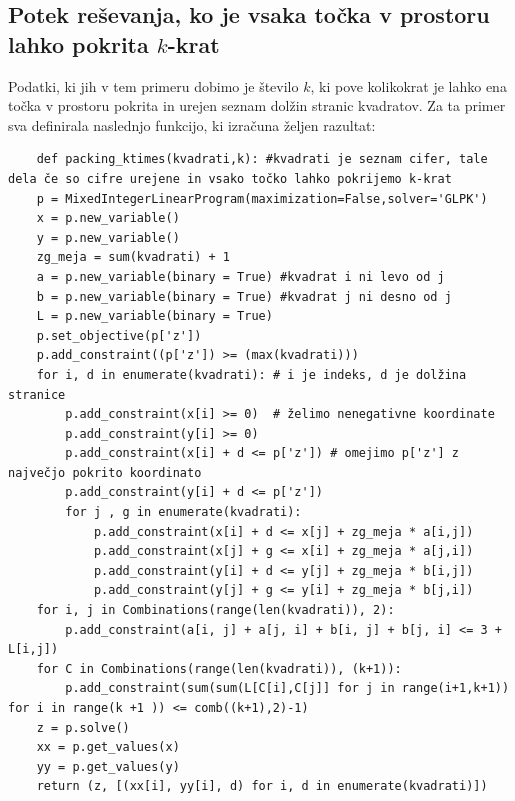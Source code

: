 \documentclass[a4paper, 11pt]{article}
\begin{document}
\subsection{Potek reševanja, ko je vsaka točka v prostoru lahko pokrita $k$-krat}
Podatki, ki jih v tem primeru dobimo je število $k$,  ki pove kolikokrat je 
lahko ena točka v prostoru pokrita in urejen seznam dolžin stranic kvadratov.
Za ta primer sva definirala naslednjo funkcijo, ki izračuna željen razultat:

\begin{verbatim}
    def packing_ktimes(kvadrati,k): #kvadrati je seznam cifer, tale dela če so cifre urejene in vsako točko lahko pokrijemo k-krat
    p = MixedIntegerLinearProgram(maximization=False,solver='GLPK')
    x = p.new_variable()
    y = p.new_variable()
    zg_meja = sum(kvadrati) + 1
    a = p.new_variable(binary = True) #kvadrat i ni levo od j
    b = p.new_variable(binary = True) #kvadrat j ni desno od j
    L = p.new_variable(binary = True)
    p.set_objective(p['z'])
    p.add_constraint((p['z']) >= (max(kvadrati)))
    for i, d in enumerate(kvadrati): # i je indeks, d je dolžina stranice
        p.add_constraint(x[i] >= 0)  # želimo nenegativne koordinate
        p.add_constraint(y[i] >= 0)
        p.add_constraint(x[i] + d <= p['z']) # omejimo p['z'] z največjo pokrito koordinato
        p.add_constraint(y[i] + d <= p['z'])
        for j , g in enumerate(kvadrati):
            p.add_constraint(x[i] + d <= x[j] + zg_meja * a[i,j])
            p.add_constraint(x[j] + g <= x[i] + zg_meja * a[j,i])
            p.add_constraint(y[i] + d <= y[j] + zg_meja * b[i,j])
            p.add_constraint(y[j] + g <= y[i] + zg_meja * b[j,i])
    for i, j in Combinations(range(len(kvadrati)), 2):
        p.add_constraint(a[i, j] + a[j, i] + b[i, j] + b[j, i] <= 3 + L[i,j])
    for C in Combinations(range(len(kvadrati)), (k+1)):
        p.add_constraint(sum(sum(L[C[i],C[j]] for j in range(i+1,k+1)) for i in range(k +1 )) <= comb((k+1),2)-1)
    z = p.solve()
    xx = p.get_values(x)
    yy = p.get_values(y)
    return (z, [(xx[i], yy[i], d) for i, d in enumerate(kvadrati)]) 
\end{verbatim}
\end{document}
